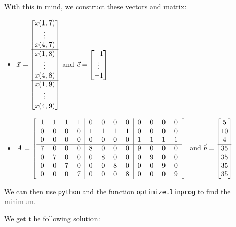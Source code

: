 \begin{enumerate}
With this in mind, we construct these vectors and matrix:
\begin{itemize}
	\item $\vec{x} = \begin{bmatrix}x(1,7) \\ \vdots \\ x(4,7) \\\hline x(1,8) \\ \vdots \\ x(4,8) \\\hline x(1,9) \\ \vdots \\ x(4,9) \end{bmatrix}$
	\hfil and \hfil $\vec{c} = \begin{bmatrix}-1 \\ \vdots \\ -1\end{bmatrix}$
	\item $A = \left[ \begin{tabular}{cccc|cccc|cccc}
		1 & 1 & 1 & 1 & 0 & 0 & 0 & 0 & 0 & 0 & 0 & 0 \\
		0 & 0 & 0 & 0 & 1 & 1 & 1 & 1 & 0 & 0 & 0 & 0 \\
		0 & 0 & 0 & 0 & 0 & 0 & 0 & 0 & 1 & 1 & 1 & 1 \\ \hline
		7 & 0 & 0 & 0 & 8 & 0 & 0 & 0 & 9 & 0 & 0 & 0 \\
		0 & 7 & 0 & 0 & 0 & 8 & 0 & 0 & 0 & 9 & 0 & 0 \\
		0 & 0 & 7 & 0 & 0 & 0 & 8 & 0 & 0 & 0 & 9 & 0  \\
		0 & 0 & 0 & 7 & 0 & 0 & 0 & 8 & 0 & 0 & 0 & 9 
		\end{tabular} \right]$	
	\hfil and \hfil $\vec{b} = \begin{bmatrix}5\\10\\4\\\hline35\\35\\35\\35\end{bmatrix}$
\end{itemize}

We can then use \texttt{python} and the function \texttt{optimize.linprog} to find the minimum.

We get t he following solution:


\end{enumerate}
